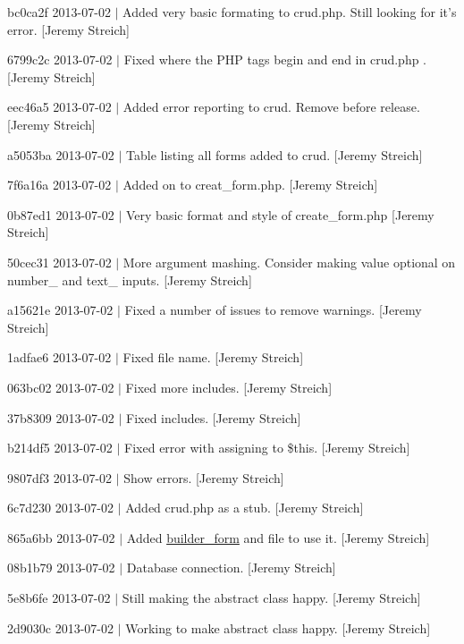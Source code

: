 \begin{DoxyItemize}
\item bc0ca2f 2013-\/07-\/02 $|$ Added very basic formating to crud.\-php. Still looking for it's error. \mbox{[}Jeremy Streich\mbox{]}
\item 6799c2c 2013-\/07-\/02 $|$ Fixed where the P\-H\-P tags begin and end in crud.\-php . \mbox{[}Jeremy Streich\mbox{]}
\item eec46a5 2013-\/07-\/02 $|$ Added error reporting to crud. Remove before release. \mbox{[}Jeremy Streich\mbox{]}
\item a5053ba 2013-\/07-\/02 $|$ Table listing all forms added to crud. \mbox{[}Jeremy Streich\mbox{]}
\item 7f6a16a 2013-\/07-\/02 $|$ Added on to creat\-\_\-form.\-php. \mbox{[}Jeremy Streich\mbox{]}
\item 0b87ed1 2013-\/07-\/02 $|$ Very basic format and style of create\-\_\-form.\-php \mbox{[}Jeremy Streich\mbox{]}
\item 50cec31 2013-\/07-\/02 $|$ More argument mashing. Consider making value optional on number\-\_\- and text\-\_\- inputs. \mbox{[}Jeremy Streich\mbox{]}
\item a15621e 2013-\/07-\/02 $|$ Fixed a number of issues to remove warnings. \mbox{[}Jeremy Streich\mbox{]}
\item 1adfae6 2013-\/07-\/02 $|$ Fixed file name. \mbox{[}Jeremy Streich\mbox{]}
\item 063bc02 2013-\/07-\/02 $|$ Fixed more includes. \mbox{[}Jeremy Streich\mbox{]}
\item 37b8309 2013-\/07-\/02 $|$ Fixed includes. \mbox{[}Jeremy Streich\mbox{]}
\item b214df5 2013-\/07-\/02 $|$ Fixed error with assigning to \$this. \mbox{[}Jeremy Streich\mbox{]}
\item 9807df3 2013-\/07-\/02 $|$ Show errors. \mbox{[}Jeremy Streich\mbox{]}
\item 6c7d230 2013-\/07-\/02 $|$ Added crud.\-php as a stub. \mbox{[}Jeremy Streich\mbox{]}
\item 865a6bb 2013-\/07-\/02 $|$ Added \hyperlink{classbuilder__form}{builder\-\_\-form} and file to use it. \mbox{[}Jeremy Streich\mbox{]}
\item 08b1b79 2013-\/07-\/02 $|$ Database connection. \mbox{[}Jeremy Streich\mbox{]}
\item 5e8b6fe 2013-\/07-\/02 $|$ Still making the abstract class happy. \mbox{[}Jeremy Streich\mbox{]}
\item 2d9030c 2013-\/07-\/02 $|$ Working to make abstract class happy. \mbox{[}Jeremy Streich\mbox{]}

\end{DoxyItemize}
